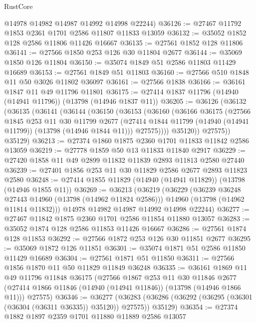 \begin{lexlean}{RustCore}
\begin{coremodule}
      @14978
      @14982
      @14987
      @14992
      @14998
      @22244)
@36126 := @27467 @11792 @1853 @2361 @1701 @2586 @11807 @11833 @13059
@36132 := @35052 @1852 @128 @2586 @11806 @11426 @16667
@36135 := @27561 @1852 @128 @11806
@36141 := @27566 @1850 @253 @126 @30 @11804 @2677
@36144 := @35069 @1850 @126 @11804
@36150 := @35074 @1849 @51 @2586 @11803 @11429 @16689
@36153 := @27561 @1849 @51 @11803
@36160 := @27566 @510 @1848 @11 @50 @3026 @11802 @36097
@36161 := @27566 @1838
@36166 := @36161 @1847 @11 @49 @11796 @11801
@36175 := @27414 @1837 @11796 (@14940 (@14941 @11796)) (@13798 (@14946 @1837 @11))
@36205 := @36126
    (@36132
      (@36135
        (@36141
          (@36144
            (@36150
              (@36153
                (@36160
                  (@36166
                    @36175
                    (@27566
                      @1845
                      @253
                      @11
                      @30
                      @11799
                      @2677
                      (@27414 @1844 @11799 (@14940 (@14941 @11799)) (@13798 (@14946 @1844 @11)))
                      @27575))))
              @35120))
          @27575))
      @35129)
@36213 := @27374 @1860 @1875 @2360 @1701 @11833 @11842 @2586 @13059
@36219 := @27778 @1859 @50 @13 @11833 @11840 @2917
@36229 := @27420 @1858 @11 @49 @2899 @11832 @11839 @2893 @11813 @2580 @27440
@36239 := @27401 @1856 @253 @11 @30 @11829 @2586 @2677 @2893 @11823 @2580
@36248 := @27414 @1855 @11829 (@14940 (@14941 @11829)) (@13798 (@14946 @1855 @11))
@36269 := @36213
    (@36219
      (@36229
        (@36239 @36248 @27443 @14960 (@13798 (@14962 @11824 @2586)))
        @14960
        (@13798 (@14962 @11814 @11832)))
      @14978
      @14982
      @14987
      @14992
      @14998
      @22244)
@36277 := @27467 @11842 @1875 @2360 @1701 @2586 @11854 @11880 @13057
@36283 := @35052 @1874 @128 @2586 @11853 @11426 @16667
@36286 := @27561 @1874 @128 @11853
@36292 := @27566 @1872 @253 @126 @30 @11851 @2677
@36295 := @35069 @1872 @126 @11851
@36301 := @35074 @1871 @51 @2586 @11850 @11429 @16689
@36304 := @27561 @1871 @51 @11850
@36311 := @27566 @1856 @1870 @11 @50 @11829 @11849 @36248
@36335 := @36161
    @1869
    @11
    @49
    @11796
    @11848
    @36175
    (@27566
      @1867
      @253
      @11
      @30
      @11846
      @2677
      (@27414 @1866 @11846 (@14940 (@14941 @11846)) (@13798 (@14946 @1866 @11)))
      @27575)
@36346 := @36277
    (@36283 (@36286 (@36292 (@36295 (@36301 (@36304 (@36311 @36335)) @35120)) @27575)) @35129)
@36354 := @27374 @1882 @1897 @2359 @1701 @11880 @11889 @2586 @13057

\end{coremodule}
\end{lexlean}
